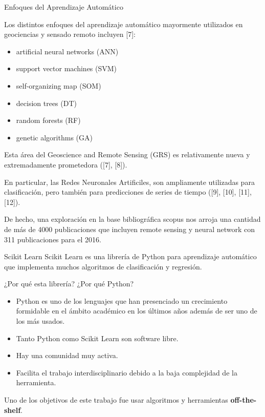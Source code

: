 \documentclass[10pt]{beamer}
\begin{document}
\begin{frame}{Enfoques del Aprendizaje Automático}

Los distintos enfoques del aprendizaje automático mayormente utilizados en
geociencias y sensado remoto incluyen [7]:

\begin{itemize}
\item artificial neural networks (ANN)
\item support vector machines (SVM)
\item self-organizing map (SOM)
\item decision trees (DT)
\item random forests (RF)
\item genetic algorithms (GA)
\end{itemize}

Esta área del Geoscience and Remote Sensing (GRS) es relativamente nueva y
extremadamente prometedora ([7], [8]).

En particular, las Redes Neuronales Artificiles, son ampliamente utilizadas para
clasificación, pero también para predicciones de series de tiempo ([9], [10],
[11], [12]).

De hecho, una exploración en la base bibliográfica scopus nos arroja una
cantidad de más de 4000 publicaciones que incluyen remote sensing y neural
network con 311 publicaciones para el 2016.

\end{frame}

\begin{frame}{Scikit Learn}
  Scikit Learn es una librería de Python para aprendizaje automático que
  implementa muchos algoritmos de clasificación y regresión.  

  ¿Por qué esta librería? ¿Por qué Python?

  \begin{itemize} 
  \item Python es uno de los lenguajes que han presenciado un crecimiento
    formidable en el ámbito académico en los últimos años además de ser uno de
    los más usados.
  \item Tanto Python como Scikit Learn son software libre.
  \item Hay una comunidad muy activa.
  \item Facilita el trabajo interdisciplinario debido a la baja complejidad de
    la herramienta.
  \end{itemize}

  Uno de los objetivos de este trabajo fue usar algoritmos y herramientas
  \textbf{off-the-shelf}.

\end{frame}
\end{document}
